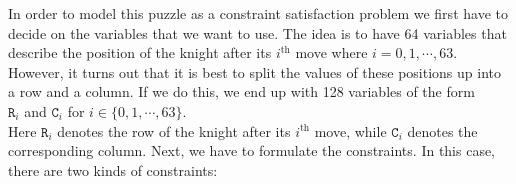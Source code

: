 In order to model this puzzle as a constraint satisfaction problem we first have to decide on the variables
that we want to use. The idea is to have 64 variables that describe the position of the knight after its
$i^{\mathrm{th}}$ move where $i=0,1,\cdots,63$.  However, it turns out that it is best to split the values of these positions up into a
row and a column.  If we do this, we end up with 128 variables of the form
\\[0.2cm]
\hspace*{1.3cm}
$\mathtt{R}_i$ and $\mathtt{C}_i$ \quad for $i \in \{0, 1, \cdots, 63\}$.
\\[0.2cm]
Here $\mathtt{R}_i$ denotes the row of the knight after its $i^{\mathrm{th}}$ move, while $\mathtt{C}_i$
denotes the corresponding column.  
Next, we have to formulate the constraints.  In this case, there are two kinds of constraints:
